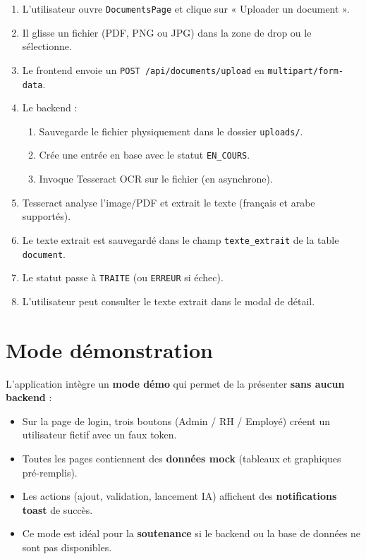 \documentclass[a4paper,12pt]{report}
\begin{document}
\begin{enumerate}
  \item L'utilisateur ouvre \texttt{DocumentsPage} et clique sur « Uploader un document ».
  \item Il glisse un fichier (PDF, PNG ou JPG) dans la zone de drop ou le sélectionne.
  \item Le frontend envoie un \texttt{POST /api/documents/upload} en \texttt{multipart/form-data}.
  \item Le backend :
  \begin{enumerate}
    \item Sauvegarde le fichier physiquement dans le dossier \texttt{uploads/}.
    \item Crée une entrée en base avec le statut \texttt{EN\_COURS}.
    \item Invoque Tesseract OCR sur le fichier (en asynchrone).
  \end{enumerate}
  \item Tesseract analyse l'image/PDF et extrait le texte (français et arabe supportés).
  \item Le texte extrait est sauvegardé dans le champ \texttt{texte\_extrait} de la table \texttt{document}.
  \item Le statut passe à \texttt{TRAITE} (ou \texttt{ERREUR} si échec).
  \item L'utilisateur peut consulter le texte extrait dans le modal de détail.
\end{enumerate}

\section{Mode démonstration}

L'application intègre un \textbf{mode démo} qui permet de la présenter \textbf{sans aucun backend} :
\begin{itemize}
  \item Sur la page de login, trois boutons (Admin / RH / Employé) créent un utilisateur fictif avec un faux token.
  \item Toutes les pages contiennent des \textbf{données mock} (tableaux et graphiques pré-remplis).
  \item Les actions (ajout, validation, lancement IA) affichent des \textbf{notifications toast} de succès.
  \item Ce mode est idéal pour la \textbf{soutenance} si le backend ou la base de données ne sont pas disponibles.
\end{itemize}
\end{document}
